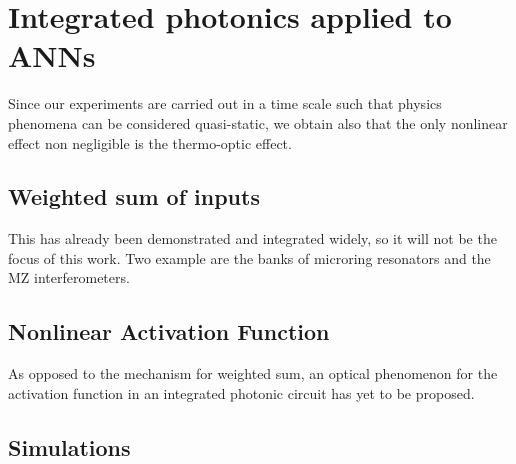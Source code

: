 \section{Integrated photonics applied to ANNs}
\label{sec:Integrated_photonics_applied_to_ANNs}
Since our experiments are carried out in a time scale such that physics phenomena can be considered quasi-static, we obtain also that the only nonlinear effect non negligible is the thermo-optic effect.

\subsection{Weighted sum of inputs}
\label{ssec:Weighted_Sum_of_inputs}
This has already been demonstrated and integrated widely, so it will not be the focus of this work.
Two example are the banks of microring resonators and the MZ interferometers.

\subsection{Nonlinear Activation Function}
\label{ssec:Nonlinear_Activation_Function}
As opposed to the mechanism for weighted sum, an optical phenomenon for the activation function in an integrated photonic circuit has yet to be proposed.

\subsection{Simulations}
\label{ssec:Simulations}

\begin{figure}[ht]
	\centering
	
	\caption{}
\end{figure}

\begin{figure}[ht]
	\centering
	
	\caption{}
\end{figure}